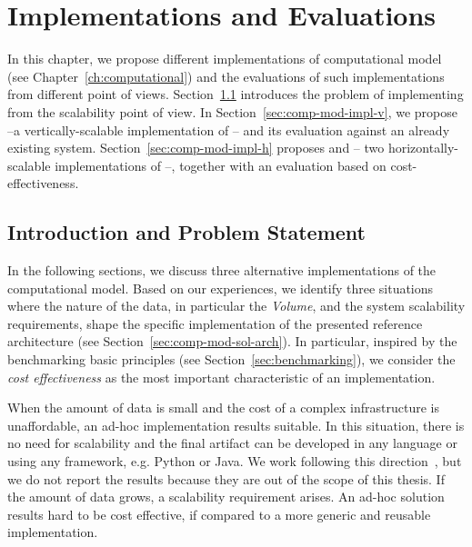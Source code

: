 \chapter{\texorpdfstring{\protect\river{}}{RIVER} Implementations and Evaluations}\label{ch:computational-impl}
{\color{red}
In this chapter, we propose different implementations of \river{} computational model (see Chapter~\ref{ch:computational}) and the evaluations of such implementations from different point of views.
Section~\ref{sec:comp-mod-impl-intro} introduces the problem of implementing \river{} from the scalability point of view.
In Section~\ref{sec:comp-mod-impl-v}, we propose \sti{} --a vertically-scalable implementation of \river{} -- and its evaluation against an already existing system.
Section~\ref{sec:comp-mod-impl-h} proposes \sparkdi{} and \hivedi{} -- two horizontally-scalable implementations of \river{}  --, together with an evaluation based on cost-effectiveness.

\section{Introduction and Problem Statement} \label{sec:comp-mod-impl-intro}
In the following sections, we discuss three alternative implementations of the \river{} computational model.
Based on our experiences, we identify three situations where the nature of the data, in particular the \textit{Volume}, and the system scalability requirements, shape the specific implementation of the presented reference architecture (see Section~\ref{sec:comp-mod-sol-arch}).
In particular, inspired by the benchmarking basic principles (see Section~\ref{sec:benchmarking}), we consider the \textit{cost effectiveness} as the most important characteristic of an implementation.

When the amount of data is small and the cost of a complex infrastructure is unaffordable, an ad-hoc implementation results suitable.
In this situation, there is no need for scalability and the final artifact can be developed in any language or using any framework, e.g. Python or Java.
We work following this direction~\cite{BalduiniJBD2018}, but we do not report the results because they are out of the scope of this thesis.
If the amount of data grows, a scalability requirement arises. An ad-hoc solution results hard to be cost effective, if compared to a more generic and reusable implementation. 

}
